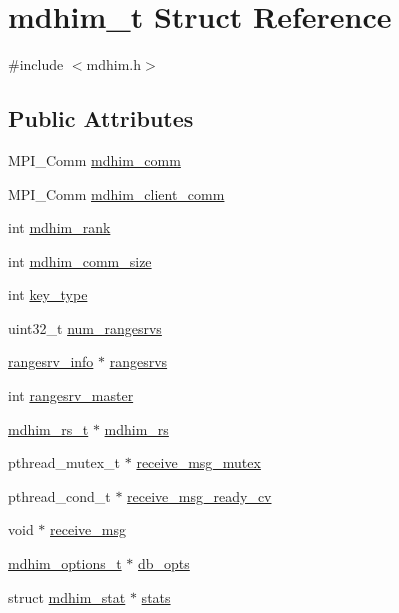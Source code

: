 \hypertarget{structmdhim__t}{\section{mdhim\-\_\-t Struct Reference}
\label{structmdhim__t}
}


{\ttfamily \#include $<$mdhim.\-h$>$}

\subsection*{Public Attributes}
\begin{DoxyCompactItemize}
\item 
M\-P\-I\-\_\-\-Comm \hyperlink{structmdhim__t_a9772a2d123d58e9cd3e4514b860aee97}{mdhim\-\_\-comm}
\item 
M\-P\-I\-\_\-\-Comm \hyperlink{structmdhim__t_aa7869e9170df4067e8ee986f5e6fda69}{mdhim\-\_\-client\-\_\-comm}
\item 
int \hyperlink{structmdhim__t_a501753bb85acfd853c73d3c888714b20}{mdhim\-\_\-rank}
\item 
int \hyperlink{structmdhim__t_ab4bf1dd32ae146382cade22a706c1380}{mdhim\-\_\-comm\-\_\-size}
\item 
int \hyperlink{structmdhim__t_ab38232f8b8b48edf417c87088d81d6e4}{key\-\_\-type}
\item 
uint32\-\_\-t \hyperlink{structmdhim__t_a41b224b41799585edf8a8b2b2f4626cc}{num\-\_\-rangesrvs}
\item 
\hyperlink{structrangesrv__info}{rangesrv\-\_\-info} $\ast$ \hyperlink{structmdhim__t_ae05a450ac4f312ae4bdb9c1ea52e53e0}{rangesrvs}
\item 
int \hyperlink{structmdhim__t_aec7f0b0a3e8bf81c839a90ec38b0809b}{rangesrv\-\_\-master}
\item 
\hyperlink{structmdhim__rs__t}{mdhim\-\_\-rs\-\_\-t} $\ast$ \hyperlink{structmdhim__t_ae555c224ade4584fcc3895f8ea19a302}{mdhim\-\_\-rs}
\item 
pthread\-\_\-mutex\-\_\-t $\ast$ \hyperlink{structmdhim__t_ae5abe6f33b5951a30f582fda42292706}{receive\-\_\-msg\-\_\-mutex}
\item 
pthread\-\_\-cond\-\_\-t $\ast$ \hyperlink{structmdhim__t_ac4a79eb13f34377840b924c41802f0fb}{receive\-\_\-msg\-\_\-ready\-\_\-cv}
\item 
void $\ast$ \hyperlink{structmdhim__t_abc3233b7d61111d19bb7ac0222a918fc}{receive\-\_\-msg}
\item 
\hyperlink{structmdhim__options__t}{mdhim\-\_\-options\-\_\-t} $\ast$ \hyperlink{structmdhim__t_a1e315ee5168e22e71f970eea38014375}{db\-\_\-opts}
\item 
struct \hyperlink{structmdhim__stat}{mdhim\-\_\-stat} $\ast$ \hyperlink{structmdhim__t_a69e06bfc0fb536ac2759b3ebb4c8cca1}{stats}
\end{DoxyCompactItemize}


